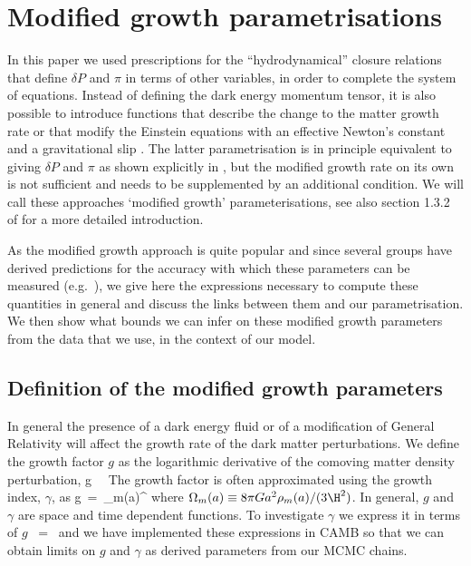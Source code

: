 \section{Modified growth parametrisations}
\label{chapter-ade:growth}

In this paper we used prescriptions for the ``hydrodynamical'' closure relations that define $\delta P$ and $\pi$ in terms of
other variables, in order to complete the system of equations. Instead of defining the dark energy momentum tensor, it is also
possible to introduce functions that describe the change to the matter growth rate \cite{Amendola:2004wa,Linder:2005in} or that modify the
Einstein equations with an effective Newton's constant and a gravitational slip \cite{Amendola:2007rr}. The latter
parametrisation is in principle equivalent to giving $\delta P$ and $\pi$ as shown explicitly
in \cite{Ballesteros:2011cm}, but the modified growth rate on its own is not sufficient and needs to be supplemented 
by an additional condition. We will call these approaches `modified growth' parameterisations, see also section 1.3.2
of \cite{Amendola:2012ys} for a more detailed introduction.

As the modified growth approach is quite popular and since several groups have derived predictions for the accuracy
with which these parameters can be measured (e.g.\ \cite{Amendola:2007rr,Pogosian:2010tj,Bean:2010zq}), we give here the expressions necessary to compute these
quantities in general and discuss the links between them and our parametrisation. We then show what bounds we
can infer on these modified growth parameters from the data that we use, in the context of our model.

\subsection{Definition of the modified growth parameters}

In general the presence of a dark energy fluid or of a modification of General Relativity will affect the growth rate of the
dark matter perturbations.
We define the growth factor $g$ as the logarithmic derivative of the comoving matter density perturbation,
\be
  g\ \equiv\ 
\ee
The growth factor is often approximated using the growth index, $\gamma$, as
\be
  g\ =\ \Omega_m(a)^\gamma
\ee
where $\Omega_m(a)\equiv 8\pi Ga^2\rho_m(a)/(3\H^2)$. In general, $g$ and $\gamma$ are space and time dependent functions. To investigate $\gamma$ we express it in terms of $g$
\be
  \gamma\ =\ 
\ee
and we have implemented these expressions in CAMB so that we can obtain limits on $g$ and $\gamma$
as derived parameters from our MCMC chains.

